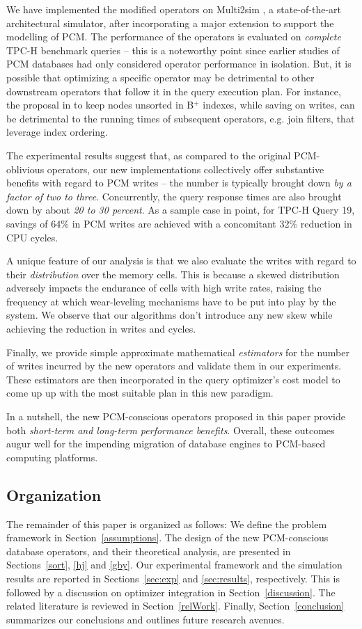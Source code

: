 We have implemented the modified operators on Multi2sim \cite{multi2sim},
a state-of-the-art architectural simulator, after incorporating a
major extension to support the modelling of PCM.  The performance of
the operators is evaluated on \emph{complete} TPC-H benchmark queries --
this is a noteworthy point since earlier studies of PCM databases had only
considered operator performance in isolation.  But, it is possible that
optimizing a specific operator may be detrimental to other downstream
operators that follow it in the query execution plan. For instance,
the proposal in \cite{chen} to keep nodes unsorted in B$^+$ indexes,
while saving on writes, can be detrimental to the running times of
subsequent operators, e.g. join filters, that leverage index ordering.

The experimental results suggest that, as compared to the original
PCM-oblivious operators, our new implementations collectively offer
substantive benefits with regard to PCM writes -- the number is typically
brought down \emph{by a factor of two to three}.  Concurrently, the query
response times are also brought down by about \emph{20 to 30 percent}.
As a sample case in point, for TPC-H Query 19, savings of 64\% in PCM
writes are achieved with a concomitant 32\% reduction in CPU cycles.

A unique feature of our analysis is that we also evaluate the writes with
regard to their \emph{distribution} over the memory cells. This is because
a skewed distribution adversely impacts the endurance of cells with high
write rates, raising the frequency at which wear-leveling mechanisms
have to be put into play by the system. We observe that our algorithms don't introduce any new skew while achieving the reduction in writes and cycles.

Finally, we provide simple approximate mathematical \emph{estimators} for the
number of writes incurred by the new operators and validate them in our
experiments. These estimators are then incorporated in the query optimizer's
cost model to come up up with the most suitable plan in this new paradigm.

In a nutshell, the new PCM-conscious operators proposed in this paper
provide both \emph{short-term and long-term performance benefits}.
Overall, these outcomes augur well for the impending migration of database
engines to PCM-based computing platforms.

\subsection*{Organization}
The remainder of this paper is organized as follows: We define the
problem framework in Section~\ref{assumptions}. The design of the new
PCM-conscious database operators, and their theoretical analysis,
are presented in Sections~\ref{sort}, \ref{hj} and \ref{gby}.
Our experimental framework and the simulation results are reported in
Sections~\ref{sec:exp} and \ref{sec:results}, respectively. This is followed by a
discussion on optimizer integration in Section~\ref{discussion}. The
related literature is reviewed in Section~\ref{relWork}. Finally,
Section~\ref{conclusion} summarizes our conclusions and outlines future
research avenues.
